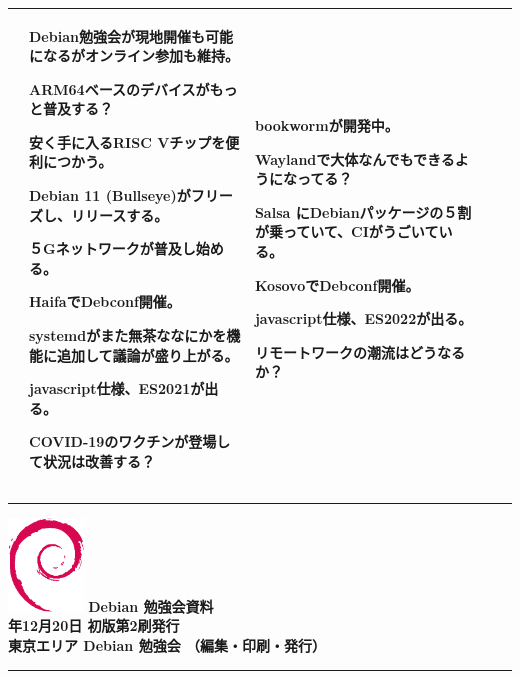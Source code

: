 \documentclass[mingoth,a4paper]{jsarticle}
\newcommand{\debmtgyear}{2020}
\newcommand{\debmtgmonth}{12}
\newcommand{\debmtgdate}{20}
\begin{document}
{\begin{tabular}[t]{|p{8em}|p{8em}|p{8em}|p{8em}|p{8em}|}
&

Debian勉強会が現地開催も可能になるがオンライン参加も維持。

ARM64ベースのデバイスがもっと普及する？

安く手に入るRISC Vチップを便利につかう。

Debian 11 (Bullseye)がフリーズし、リリースする。

５Gネットワークが普及し始める。

HaifaでDebconf開催。

systemdがまた無茶ななにかを機能に追加して議論が盛り上がる。

javascript仕様、ES2021が出る。

COVID-19のワクチンが登場して状況は改善する？

&

bookwormが開発中。

Waylandで大体なんでもできるようになってる？

Salsa にDebianパッケージの５割が乗っていて、CIがうごいている。

KosovoでDebconf開催。

javascript仕様、ES2022が出る。

リモートワークの潮流はどうなるか？

\\

\hline
\end{tabular}
}

\printindex


\vspace*{15cm}
\hrule
\vspace{2mm}
\includegraphics[width=2cm]{image200502/openlogo-nd.eps}
\noindent \Large \bf Debian 勉強会資料\\
\noindent \normalfont \debmtgyear{}年\debmtgmonth{}月\debmtgdate{}日 \hspace{5mm}  初版第2刷発行\\
\noindent \normalfont 東京エリア Debian 勉強会 （編集・印刷・発行）\\
\hrule
\end{document}
